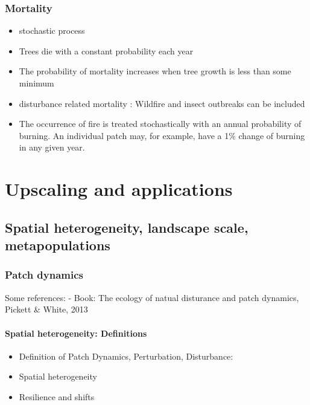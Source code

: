 \documentclass[oneside]{book}
\providecommand{\tightlist}{%
  \setlength{\itemsep}{0pt}\setlength{\parskip}{0pt}}
\begin{document}
\section{Mortality}\label{mortality}

\begin{itemize}
\item
  stochastic process
\item
  Trees die with a constant probability each year
\item
  The probability of mortality increases when tree growth is less than
  some minimum
\item
  disturbance related mortality : Wildfire and insect outbreaks can be
  included
\item
  The occurrence of fire is treated stochastically with an annual
  probability of burning. An individual patch may, for example, have a
  1\% change of burning in any given year.
\end{itemize}

\part{Upscaling and
applications}\label{part-upscaling-and-applications}

\chapter{Spatial heterogeneity, landscape scale,
metapopulations}\label{spatial-heterogeneity-landscape-scale-metapopulations}


\section{Patch dynamics}\label{patch-dynamics}

Some references: - Book: The ecology of natual disturance and patch
dynamics, Pickett \& White, 2013

\subsection{Spatial heterogeneity:
Definitions}\label{spatial-heterogeneity-definitions}

\begin{itemize}
\tightlist
\item
  Definition of Patch Dynamics, Perturbation, Disturbance:
\item
  Spatial heterogeneity
\item
  Resilience and shifts
\end{itemize}
\end{document}
